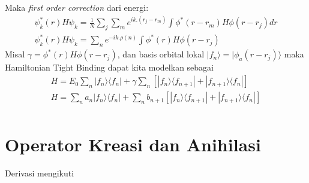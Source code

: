 Maka \textit{first order correction} dari energi:
\begin{align}
    \psi_k^*(r)H\psi_k=\frac{1}{N}\sum_j \sum_m e^{ik.(r_j-r_m)}\int\phi^*(r-r_m)H\phi(r-r_j)dr
    \\ \psi_k^*(r)H\psi_k= \sum_n e^{-ik.\rho(n)}\int\phi^*(r)H\phi(r - r_j)
\end{align}
Misal $\gamma = \phi^*(r)H\phi(r - r_j) $, dan basis orbital lokal $|f_n \rangle = | \phi_a (r - r_j) \rangle$ maka Hamiltonian Tight Binding dapat kita modelkan sebagai
\begin{align}
  H = E_0 \sum_n |f_n \rangle \langle f_n | + \gamma \sum_n [|f_n \rangle \langle f_{n+1} | + |f_{n+1}\rangle \langle f_n | ] \\ 
  H = \sum_n a_n |f_n \rangle \langle f_n | +  \sum_n b_{n+1} [|f_n \rangle \langle f_{n+1} | + |f_{n+1}\rangle \langle f_n | ] \\ 
\end{align}

\section{Operator Kreasi dan Anihilasi}
Derivasi mengikuti \parencite{adams2014quantum}

